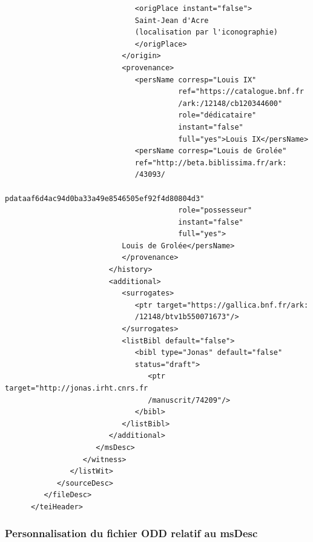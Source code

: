 \documentclass[a4paper,12pt,twoside]{book}
\begin{document}
\begin{verbatim}
                              <origPlace instant="false">
                              Saint-Jean d'Acre 
                              (localisation par l'iconographie)
                              </origPlace>
                           </origin>
                           <provenance>
                              <persName corresp="Louis IX"
                                        ref="https://catalogue.bnf.fr
                                        /ark:/12148/cb120344600"
                                        role="dédicataire"
                                        instant="false"
                                        full="yes">Louis IX</persName>
                              <persName corresp="Louis de Grolée"      
                              ref="http://beta.biblissima.fr/ark:
                              /43093/
                              pdataaf6d4ac94d0ba33a49e8546505ef92f4d80804d3"
                                        role="possesseur"
                                        instant="false"
                                        full="yes">
                           Louis de Grolée</persName>
                           </provenance>
                        </history>
                        <additional>
                           <surrogates>
                              <ptr target="https://gallica.bnf.fr/ark:
                              /12148/btv1b550071673"/>
                           </surrogates>
                           <listBibl default="false">
                              <bibl type="Jonas" default="false" 
                              status="draft">
                                 <ptr target="http://jonas.irht.cnrs.fr
                                 /manuscrit/74209"/>
                              </bibl>
                           </listBibl>
                        </additional>
                     </msDesc>
                  </witness>
               </listWit>
            </sourceDesc>
         </fileDesc>
      </teiHeader>
	\end{verbatim}
	
	\subsubsection{\label{personnalisation_ODD}Personnalisation du fichier ODD relatif au msDesc}
	
\end{document}
